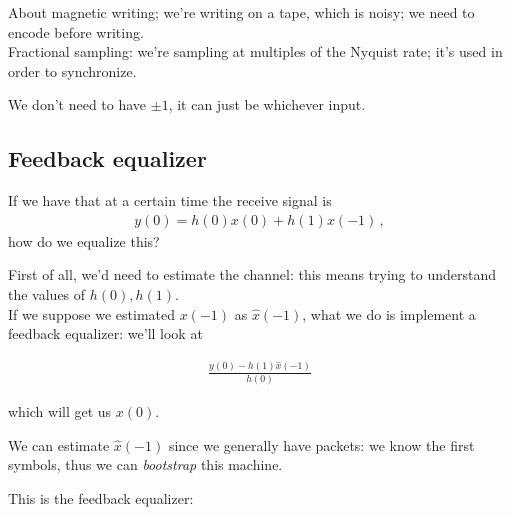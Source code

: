 \documentclass[a4paper, 12pt]{book}
\begin{document}

\noindent
\colorbox{obsidianGreen}{%
    \begin{minipage}{\dimexpr\linewidth-2\fboxsep}
    \setlength{\parskip}{0.5em}
    About magnetic writing; we're writing on a tape, which is noisy; we need to encode before writing.\\
    Fractional sampling: we're sampling at multiples of the Nyquist rate; it's used in order to synchronize.
    \end{minipage}%
}

\vspace{0.5em}

\noindent
\colorbox{obsidianGreen}{%
    \begin{minipage}{\dimexpr\linewidth-2\fboxsep}
    We don't need to have $\pm 1$, it can just be whichever input.
    \end{minipage}%
}

\subsection{Feedback equalizer}

If we have that at a certain time the receive signal is
\begin{align}
    y(0) = h(0)x(0) + h(1)x(-1) \,,
\end{align}
how do we equalize this?

First of all, we'd need to estimate the channel: this means trying to understand the values of $h(0), h(1)$.\\
If we suppose we estimated $x(-1)$ as $\hat{x}(-1)$, what we do is implement a feedback equalizer: we'll look at

\begin{align}
    \frac{y(0) - h(1)\hat{x}(-1)}{h(0)}
\end{align}

which will get us $x(0)$.

We can estimate $\hat{x}(-1)$ since we generally have packets: we know the first symbols, thus we can \textit{bootstrap} this machine.

This is the feedback equalizer:
\begin{center}
\end{center}
\end{document}
